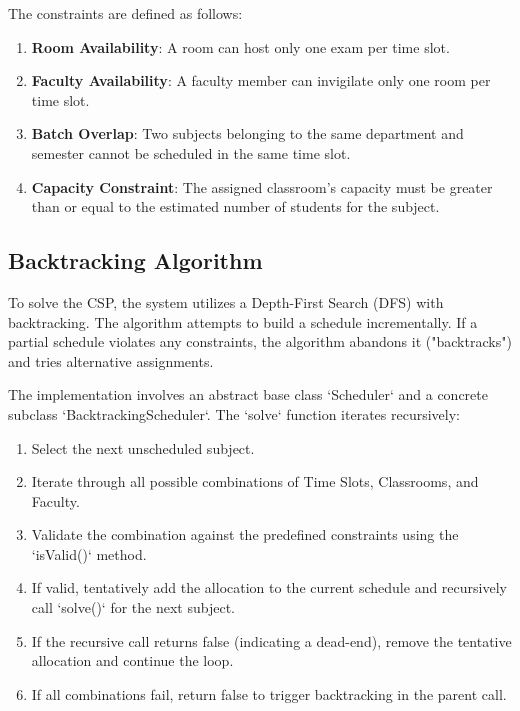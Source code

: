 \documentclass[conference]{IEEEtran}
\begin{document}
The constraints are defined as follows:
\begin{enumerate}
    \item \textbf{Room Availability}: A room can host only one exam per time slot.
    \item \textbf{Faculty Availability}: A faculty member can invigilate only one room per time slot.
    \item \textbf{Batch Overlap}: Two subjects belonging to the same department and semester cannot be scheduled in the same time slot.
    \item \textbf{Capacity Constraint}: The assigned classroom's capacity must be greater than or equal to the estimated number of students for the subject.
\end{enumerate}

\subsection{Backtracking Algorithm}
To solve the CSP, the system utilizes a Depth-First Search (DFS) with backtracking. The algorithm attempts to build a schedule incrementally. If a partial schedule violates any constraints, the algorithm abandons it ("backtracks") and tries alternative assignments.

The implementation involves an abstract base class `Scheduler` and a concrete subclass `BacktrackingScheduler`. The `solve` function iterates recursively:
\begin{enumerate}
    \item Select the next unscheduled subject.
    \item Iterate through all possible combinations of Time Slots, Classrooms, and Faculty.
    \item Validate the combination against the predefined constraints using the `isValid()` method.
    \item If valid, tentatively add the allocation to the current schedule and recursively call `solve()` for the next subject.
    \item If the recursive call returns false (indicating a dead-end), remove the tentative allocation and continue the loop.
    \item If all combinations fail, return false to trigger backtracking in the parent call.
\end{enumerate}
\end{document}
